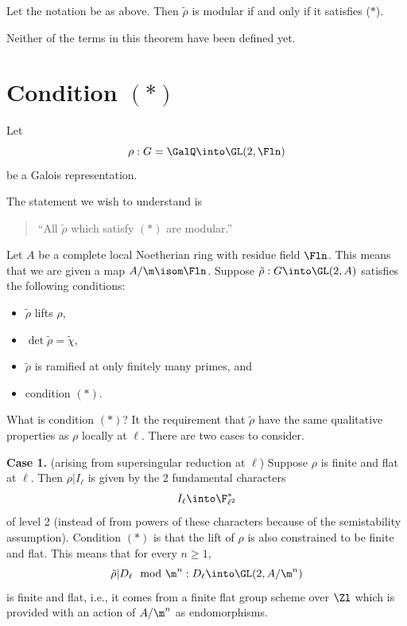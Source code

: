 \documentclass{report}
\begin{document}
\begin{theorem} Let the notation be as above.  Then
$\tilde{\rho}$ is modular if and only if it satisfies ($*$).\end{theorem}

Neither of the terms in this theorem have been defined yet.



\section{Condition $(*)$}
Let
$$\rho:G=\GalQ\into \GL(2,\Fln)$$
be a Galois representation.

The statement we wish to understand is
\begin{quote}
    ``All $\tilde{\rho}$ which satisfy $(*)$ are modular.''
\end{quote}

Let $A$ be a complete local Noetherian ring with residue
field $\Fln$. This means that we are given a map $A/\m\isom\Fln$.
Suppose $\tilde{\rho}:G\into\GL(2,A)$ satisfies the following conditions:
\begin{itemize}
\item $\tilde{\rho}$ lifts $\rho$,
\item $\det\tilde{\rho}=\tilde{\chi}$,
\item $\tilde{\rho}$ is ramified at only finitely many primes, and
\item condition $(*)$.
\end{itemize}

What is condition $(*)$?
It the requirement that $\tilde{\rho}$ have the same qualitative
properties as $\rho$ locally at $\ell$. There are two cases to consider.

{\bfseries Case 1.} (arising from supersingular reduction at $\ell$)
Suppose $\rho$ is finite and flat at $\ell$. Then $\rho|I_{\ell}$ is
given by the 2 fundamental characters $$I_{\ell}\into\F^*_{\ell^2}$$
of level 2 (instead of from powers of these characters
because of the semistability assumption). Condition
$(*)$ is that the lift of $\rho$ is also constrained to be
finite and flat. This means that for every $n\geq 1$,
$$\tilde{\rho}|D_{\ell} \mod \m^n : D_{\ell}\into \GL(2,A/\m^n)$$
is finite and flat, i.e., it comes from a finite flat group scheme
over $\Zl$ which is provided with an action of $A/\m^n$ as endomorphisms.
\end{document}
